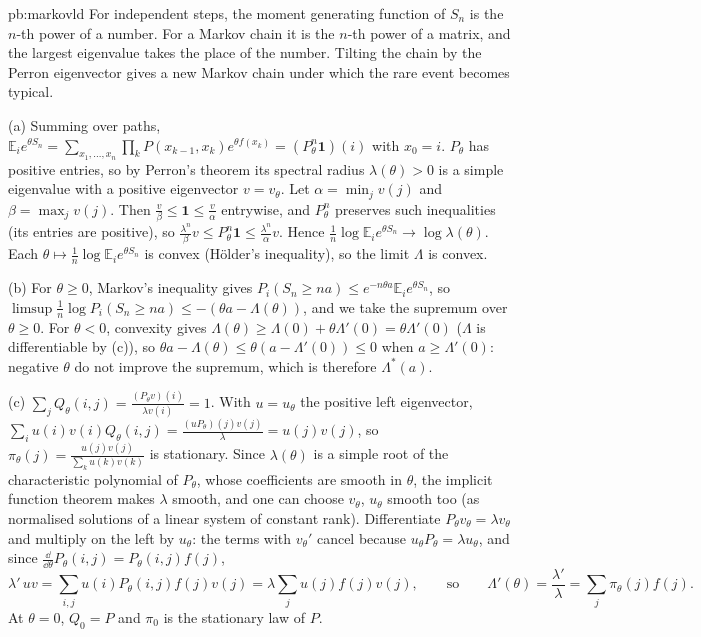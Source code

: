\begin{solution}{pb:markovld}
\idea For independent steps, the moment generating function of $S_n$ is the $n$-th power of a number. For a Markov chain it is the $n$-th power of a matrix, and the largest
eigenvalue takes the place of the number. Tilting the chain by the Perron eigenvector gives a new Markov chain under which the rare event becomes typical.

\writeup (a) Summing over paths, $\mathbb E_ie^{\theta S_n}=\sum_{x_1,\dots,x_n}\prod_kP(x_{k-1},x_k)e^{\theta f(x_k)}=(P_\theta^n\mathbf 1)(i)$ with $x_0=i$. $P_\theta$ has positive entries, so
by Perron's theorem its spectral radius $\lambda(\theta)>0$ is a simple eigenvalue with a positive eigenvector $v=v_\theta$. Let $\alpha=\min_jv(j)$ and $\beta=\max_jv(j)$. Then
$\frac v\beta\le\mathbf 1\le\frac v\alpha$ entrywise, and $P_\theta^n$ preserves such inequalities (its entries are positive), so $\frac{\lambda^n}\beta v\le P_\theta^n\mathbf 1\le\frac{\lambda^n}\alpha v$.
Hence $\frac1n\log\mathbb E_ie^{\theta S_n}\to\log\lambda(\theta)$. Each $\theta\mapsto\frac1n\log\mathbb E_ie^{\theta S_n}$ is convex (H\"older's inequality), so the limit $\Lambda$ is convex.

(b) For $\theta\ge0$, Markov's inequality gives $P_i(S_n\ge na)\le e^{-n\theta a}\mathbb E_ie^{\theta S_n}$, so $\limsup\frac1n\log P_i(S_n\ge na)\le-(\theta a-\Lambda(\theta))$, and we
take the supremum over $\theta\ge0$. For $\theta<0$, convexity gives $\Lambda(\theta)\ge\Lambda(0)+\theta\Lambda'(0)=\theta\Lambda'(0)$ ($\Lambda$ is differentiable by (c)), so
$\theta a-\Lambda(\theta)\le\theta(a-\Lambda'(0))\le0$ when $a\ge\Lambda'(0)$: negative $\theta$ do not improve the supremum, which is therefore $\Lambda^*(a)$.

(c) $\sum_jQ_\theta(i,j)=\frac{(P_\theta v)(i)}{\lambda v(i)}=1$. With $u=u_\theta$ the positive left eigenvector, $\sum_iu(i)v(i)Q_\theta(i,j)=\frac{(uP_\theta)(j)v(j)}\lambda=u(j)v(j)$,
so $\pi_\theta(j)=\frac{u(j)v(j)}{\sum_ku(k)v(k)}$ is stationary. Since $\lambda(\theta)$ is a simple root of the characteristic polynomial of $P_\theta$, whose coefficients are
smooth in $\theta$, the implicit function theorem makes $\lambda$ smooth, and one can choose $v_\theta$, $u_\theta$ smooth too (as normalised solutions of a linear system of
constant rank). Differentiate $P_\theta v_\theta=\lambda v_\theta$ and multiply on the left by $u_\theta$: the terms with $v_\theta'$ cancel because $u_\theta P_\theta=\lambda u_\theta$,
and since $\frac{\dd}{\dd\theta}P_\theta(i,j)=P_\theta(i,j)f(j)$,
\[
\lambda'\,uv=\sum_{i,j}u(i)P_\theta(i,j)f(j)v(j)=\lambda\sum_ju(j)f(j)v(j),\qquad\text{so}\qquad\Lambda'(\theta)=\frac{\lambda'}\lambda=\sum_j\pi_\theta(j)f(j).
\]
At $\theta=0$, $Q_0=P$ and $\pi_0$ is the stationary law of $P$.


\end{solution}
